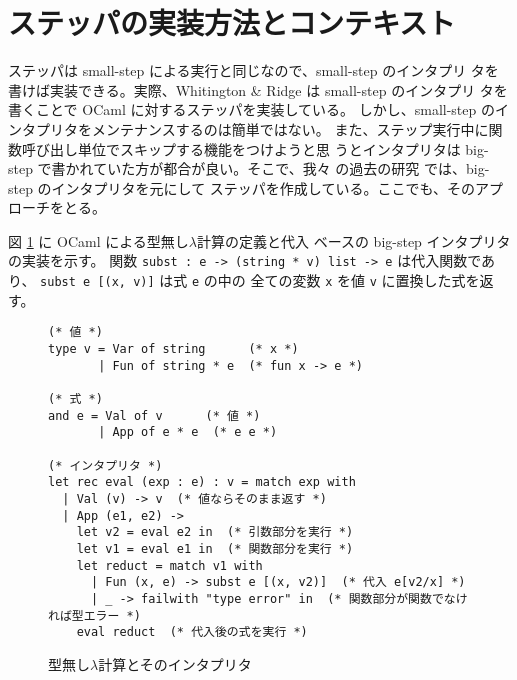 \section{ステッパの実装方法とコンテキスト}
\label{section:context}

ステッパは small-step による実行と同じなので、small-step のインタプリ
タを書けば実装できる。実際、Whitington \& Ridge \cite{EPTCS294.3} は small-step のインタプリ
タを書くことで OCaml に対するステッパを実装している。
しかし、small-step のインタプリタをメンテナンスするのは簡単ではない。
また、ステップ実行中に関数呼び出し単位でスキップする機能をつけようと思
うとインタプリタは big-step で書かれていた方が都合が良い。そこで、我々
の過去の研究 \cite{FCA19} では、big-step のインタプリタを元にして
ステッパを作成している。ここでも、そのアプローチをとる。

図 \ref{figure:lambda} に OCaml による型無し$\lambda$計算の定義と代入
ベースの big-step インタプリタの実装を示す。
関数 \texttt{subst :\ e -> (string * v) list -> e} は代入関数であり、
\texttt{subst e [(x, v)]} は式 \texttt{e} の中の
全ての変数 \texttt{x} を値 \texttt{v} に置換した式を返す。



\begin{figure}
\begin{verbatim}
(* 値 *)
type v = Var of string      (* x *)
       | Fun of string * e  (* fun x -> e *)

(* 式 *)
and e = Val of v      (* 値 *)
       | App of e * e  (* e e *)

(* インタプリタ *)
let rec eval (exp : e) : v = match exp with
  | Val (v) -> v  (* 値ならそのまま返す *)
  | App (e1, e2) ->
    let v2 = eval e2 in  (* 引数部分を実行 *)
    let v1 = eval e1 in  (* 関数部分を実行 *)
    let reduct = match v1 with
      | Fun (x, e) -> subst e [(x, v2)]  (* 代入 e[v2/x] *)
      | _ -> failwith "type error" in  (* 関数部分が関数でなければ型エラー *)
    eval reduct  (* 代入後の式を実行 *)
\end{verbatim}
\caption{型無し$\lambda$計算とそのインタプリタ}
\label{figure:lambda}
\end{figure}

